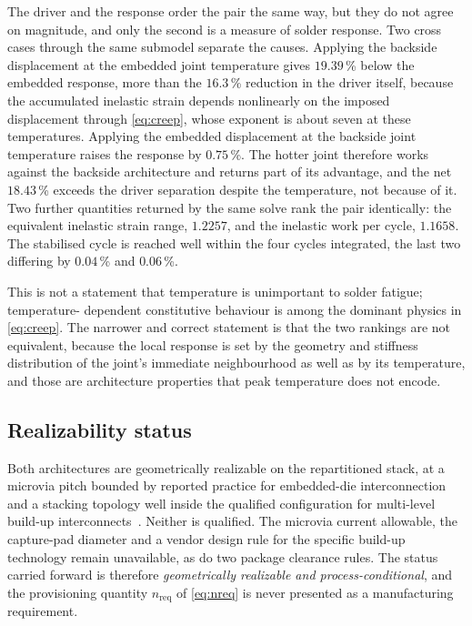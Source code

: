 \documentclass[journal]{IEEEtran}
\begin{document}
The driver and the response order the pair the same way, but they do not agree on magnitude,
and only the second is a measure of solder response. Two cross cases through the same
submodel separate the causes. Applying the backside displacement at the embedded joint
temperature gives $19.39$\,\% below the embedded response, more than the $16.3$\,\%
reduction in the driver itself, because the accumulated inelastic strain depends nonlinearly
on the imposed displacement through \eqref{eq:creep}, whose exponent is about seven at these
temperatures. Applying the embedded displacement at the backside joint temperature raises the
response by $0.75$\,\%. The hotter joint therefore works against the backside architecture
and returns part of its advantage, and the net $18.43$\,\% exceeds the driver separation
despite the temperature, not because of it. Two further quantities returned by the same solve rank the pair
identically: the equivalent inelastic strain range, $1.2257$, and the inelastic work per
cycle, $1.1658$. The stabilised cycle is reached well within the four cycles integrated, the
last two differing by $0.04$\,\% and $0.06$\,\%.

This is not a statement that temperature is unimportant to solder fatigue; temperature-
dependent constitutive behaviour is among the dominant physics in \eqref{eq:creep}. The
narrower and correct statement is that the two rankings are not equivalent, because the local
response is set by the geometry and stiffness distribution of the joint's immediate
neighbourhood as well as by its temperature, and those are architecture properties that peak
temperature does not encode.

\subsection{Realizability status}
Both architectures are geometrically realizable on the repartitioned stack, at a microvia
pitch bounded by reported practice for embedded-die
interconnection~\cite{Ostmann2008ChipEmbedding} and a stacking topology well inside the
qualified configuration for multi-level build-up interconnects~\cite{Cauwe2023HDI}. Neither
is qualified. The microvia current allowable, the capture-pad diameter and a vendor design
rule for the specific build-up technology remain unavailable, as do two package clearance
rules. The status carried forward is therefore \emph{geometrically realizable and
process-conditional}, and the provisioning quantity $n_{\mathrm{req}}$ of \eqref{eq:nreq} is
never presented as a manufacturing requirement.
\end{document}
